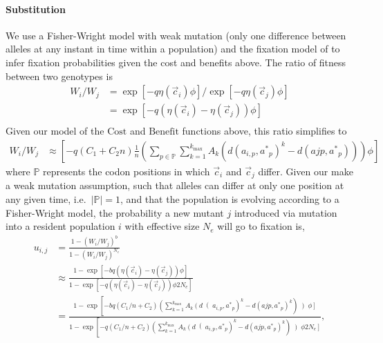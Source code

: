 \documentclass{article}
\newcommand{\setP}{\ensuremath{\mathbb{P}}\xspace}
\newcommand{\Ne}{\ensuremath{{N_e}}\xspace}
\newcommand{\kmax}{\ensuremath{{k_{\max}}}\xspace}
\newcommand{\cvec}{\ensuremath{\Vec{c}}\xspace}
\newcommand{\cveci}{\ensuremath{\cvec_i}\xspace}
\newcommand{\cvecj}{\ensuremath{\cvec_j}\xspace}
\newcommand{\aip}{\ensuremath{a_{i,p}}\xspace}
\newcommand{\aopt}{\ensuremath{a^*}\xspace}
\newcommand{\aoptp}{\ensuremath{\aopt_p}\xspace}
\newcommand{\Cost}{\ensuremath{\text{Cost}}\xspace}
\newcommand{\Func}{\ensuremath{\text{Benefit}}\xspace}
\begin{document}
\paragraph*{Substitution}
We use a Fisher-Wright \cite{FisherWright} model with weak mutation (only one difference between alleles at any instant in time within a population) and the fixation model of \cite{SellaAndHirsh05} to infer fixation probabilities given the cost and benefits above.
The ratio of fitness between two genotypes is
\begin{align*}
  W_i/W_j &=  \exp\left[- q \eta(\cveci) \phi\right]/\exp\left[- q \eta(\cvecj) \phi\right]\\
  &=  \exp\left[- q \left(\eta(\cveci)- \eta(\cvecj)\right) \phi\right]\\
\end{align*}
Given our model of the \Cost and \Func functions above, this ratio simplifies to
\begin{align}
  W_i/W_j &\approx \left[- q \left(C_1 + C_2 n\right) \frac{1}{n}\left(\sum_{p \in \setP} \sum_{k=1}^\kmax A_k \left(d\left(\aip,\aoptp\right)^k - d\left(ajp,\aoptp\right)\right)\right) \phi \right]
\end{align}
where \setP represents the codon positions in which \cveci and \cvecj differ.
Given our make a weak mutation assumption, such that alleles can differ at only one position at any given time, i.e.~$|\setP| = 1$, and that the population is evolving according to a Fisher-Wright model, the probability a new mutant $j$ introduced via mutation into a resident population $i$ with effective size \Ne will go to fixation is,
\begin{align*}
  u_{i,j} &=  \frac{1 - \left(W_i/W_j\right)^b}{1 - \left(W_i/W_j\right)^\Ne}\\
   &\approx \frac{1-\exp\left[- b q \left(\eta(\cveci)- \eta(\cvecj)\right) \phi\right]}{1-\exp\left[- q \left(\eta(\cveci)- \eta(\cvecj)\right) \phi 2\Ne\right]}\\
   &= \frac{1- \exp\left[- b q \left(C_1/n + C_2\right)\left(\sum_{k=1}^\kmax A_k \left(d\right(\aip,\aoptp\right)^k - d\left(ajp,\aoptp\right)^k\right)\left) \phi\right]}{1-\exp\left[- q \left(C_1/n + C_2\right)\left(\sum_{k=1}^\kmax A_k \left(d\right(\aip,\aoptp\right)^k - d\left(ajp,\aoptp\right)^k\right)\left) \phi 2 \Ne\right]},
\end{align*}
\end{document}
